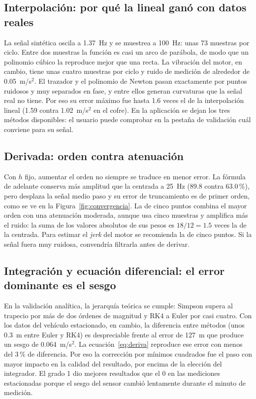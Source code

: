 \subsection{Interpolación: por qué la lineal ganó con datos reales}

La señal sintética oscila a 1.37~Hz y se muestrea a 100~Hz: unas 73 muestras por ciclo. Entre dos muestras la función es casi un arco de parábola, de modo que un polinomio cúbico la reproduce mejor que una recta. La vibración del motor, en cambio, tiene unas cuatro muestras por ciclo y ruido de medición de alrededor de 0.05~m/s$^2$. El trazador y el polinomio de Newton pasan exactamente por puntos ruidosos y muy separados en fase, y entre ellos generan curvaturas que la señal real no tiene. Por eso su error máximo fue hasta 1.6 veces el de la interpolación lineal (1.59 contra 1.02~m/s$^2$ en el cofre). En la aplicación se dejan los tres métodos disponibles: el usuario puede comprobar en la pestaña de validación cuál conviene para su señal.

\subsection{Derivada: orden contra atenuación}

Con $h$ fijo, aumentar el orden no siempre se traduce en menor error. La fórmula de adelante conserva más amplitud que la centrada a 25~Hz (89.8 contra 63.0\,\%), pero desplaza la señal medio paso y su error de truncamiento es de primer orden, como se ve en la Figura~\ref{fig:convergencia}. La de cinco puntos combina el mayor orden con una atenuación moderada, aunque usa cinco muestras y amplifica más el ruido: la suma de los valores absolutos de sus pesos es $18/12 = 1.5$ veces la de la centrada. Para estimar el \textit{jerk} del motor se recomienda la de cinco puntos. Si la señal fuera muy ruidosa, convendría filtrarla antes de derivar.

\subsection{Integración y ecuación diferencial: el error dominante es el sesgo}

En la validación analítica, la jerarquía teórica se cumple: Simpson supera al trapecio por más de dos órdenes de magnitud y RK4 a Euler por casi cuatro. Con los datos del vehículo estacionado, en cambio, la diferencia entre métodos (unos 0.3~m entre Euler y RK4) es despreciable frente al error de 127~m que produce un sesgo de 0.064~m/s$^2$. La ecuación~\eqref{eq:deriva} reproduce ese error con menos del 3\,\% de diferencia. Por eso la corrección por mínimos cuadrados fue el paso con mayor impacto en la calidad del resultado, por encima de la elección del integrador. El grado 1 dio mejores resultados que el 0 en las mediciones estacionadas porque el sesgo del sensor cambió lentamente durante el minuto de medición.

